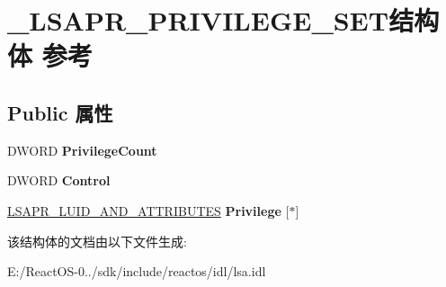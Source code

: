 \hypertarget{struct___l_s_a_p_r___p_r_i_v_i_l_e_g_e___s_e_t}{}\section{\+\_\+\+L\+S\+A\+P\+R\+\_\+\+P\+R\+I\+V\+I\+L\+E\+G\+E\+\_\+\+S\+E\+T结构体 参考}
\label{struct___l_s_a_p_r___p_r_i_v_i_l_e_g_e___s_e_t}
\subsection*{Public 属性}
\begin{DoxyCompactItemize}
\item 
\mbox{\label{struct___l_s_a_p_r___p_r_i_v_i_l_e_g_e___s_e_t_ab6c89a8f33b1b825859f32bad4be0d65}} 
D\+W\+O\+RD {\bfseries Privilege\+Count}
\item 
\mbox{\label{struct___l_s_a_p_r___p_r_i_v_i_l_e_g_e___s_e_t_a2e4d3cf7b435620ebd5bc5d7ce16d095}} 
D\+W\+O\+RD {\bfseries Control}
\item 
\mbox{\label{struct___l_s_a_p_r___p_r_i_v_i_l_e_g_e___s_e_t_ae1ea729d065aa70a6d9b6abcd765b559}} 
\hyperlink{struct___l_s_a_p_r___l_u_i_d___a_n_d___a_t_t_r_i_b_u_t_e_s}{L\+S\+A\+P\+R\+\_\+\+L\+U\+I\+D\+\_\+\+A\+N\+D\+\_\+\+A\+T\+T\+R\+I\+B\+U\+T\+ES} {\bfseries Privilege} \mbox{[}$\ast$\mbox{]}
\end{DoxyCompactItemize}


该结构体的文档由以下文件生成\+:\begin{DoxyCompactItemize}
\item 
E\+:/\+React\+O\+S-\/0../sdk/include/reactos/idl/lsa.\+idl\end{DoxyCompactItemize}

